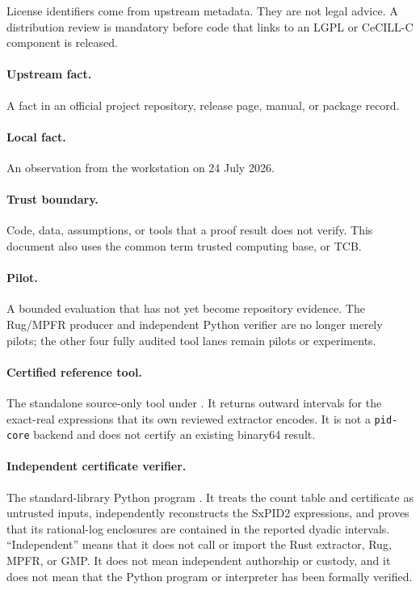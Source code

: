\documentclass[11pt]{article}
\begin{document}
License identifiers come from upstream metadata.  They are not legal advice.  A distribution
review is mandatory before code that links to an LGPL or CeCILL-C component is released.

\paragraph{Upstream fact.}
A fact in an official project repository, release page, manual, or package record.

\paragraph{Local fact.}
An observation from the workstation on 24 July 2026.

\paragraph{Trust boundary.}
Code, data, assumptions, or tools that a proof result does not verify.  This document also uses
the common term trusted computing base, or TCB.

\paragraph{Pilot.}
A bounded evaluation that has not yet become repository evidence.  The Rug/MPFR producer and
independent Python verifier are no longer merely pilots; the other four fully audited tool lanes
remain pilots or experiments.

\paragraph{Certified reference tool.}
The standalone source-only tool under .  It returns outward
intervals for the exact-real expressions that its own reviewed extractor encodes.  It is not a
\texttt{pid-core} backend and does not certify an existing binary64 result.

\paragraph{Independent certificate verifier.}
The standard-library Python program
.  It treats the count table and
certificate as untrusted inputs, independently reconstructs the SxPID2 expressions, and proves
that its rational-log enclosures are contained in the reported dyadic intervals.  ``Independent''
means that it does not call or import the Rust extractor, Rug, MPFR, or GMP\@.  It does not mean
independent authorship or custody, and it does not mean that the Python program or interpreter has
been formally verified.
\end{document}
